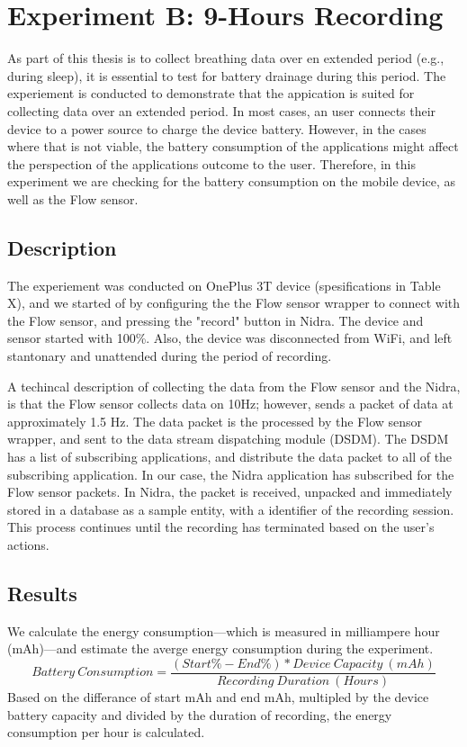 \section{Experiment B: 9-Hours Recording}
As part of this thesis is to collect breathing data over en extended period (e.g., during sleep), it is essential to test for battery drainage during this period. The experiement is conducted to demonstrate that the appication is suited for collecting data over an extended period. In most cases, an user connects their device to a power source to charge the device battery. However, in the cases where that is not viable, the battery consumption of the applications might affect the perspection of the applications outcome to the user. Therefore, in this experiment we are checking for the battery consumption on the mobile device, as well as the Flow sensor. 

\subsection{Description}
The experiement was conducted on OnePlus 3T device (spesifications in Table X), and we started of by configuring the the Flow sensor wrapper to connect with the Flow sensor, and pressing the "record" button in Nidra. The device and sensor started with 100\%. Also, the device was disconnected from WiFi, and left stantonary and unattended during the period of recording.  

A techincal description of collecting the data from the Flow sensor and the Nidra, is that the Flow sensor collects data on 10Hz; however, sends a packet of data at approximately 1.5 Hz. The data packet is the processed by the Flow sensor wrapper, and sent to the data stream dispatching module (DSDM). The DSDM has a list of subscribing applications, and distribute the data packet to all of the subscribing application. In our case, the Nidra application has subscribed for the Flow sensor packets. In Nidra, the packet is received, unpacked and immediately stored in a database as a sample entity, with a identifier of the recording session. This process continues until the recording has terminated based on the user's actions.

\subsection{Results}

We calculate the energy consumption---which is measured in milliampere hour (mAh)---and estimate the averge energy consumption during the experiment. 
\begin{equation} \label{losscount}
Battery\ Consumption = \frac{(Start\% - End\%) * Device\ Capacity\ (mAh)}{Recording\ Duration\ (Hours)}
\end{equation}
Based on the differance of start mAh and end mAh, multipled by the device battery capacity and divided by the duration of recording, the energy consumption per hour is calculated. 

